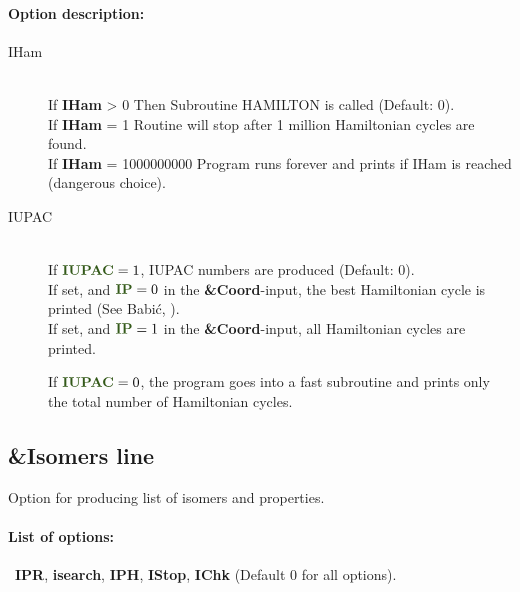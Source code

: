 \documentclass[article,a4paper,twoside]{memoir}
\newcommand{\paramname}[1]{{\color{green}\textbf{#1}}}
\begin{document}
\paragraph{Option description:}
\begin{description}
\item[IHam] \ \\
  If \paramname{IHam} > 0 Then Subroutine HAMILTON is called (Default: 0).\\
  If \paramname{IHam} = 1 Routine will stop after 1 million Hamiltonian cycles are found.\\
  If \paramname{IHam} = 1000000000 Program runs forever and prints if IHam is reached (dangerous choice).\\
\item[IUPAC]\ \\ 
  If $\paramname{IUPAC} = 1$, IUPAC numbers are produced (Default: 0).\\
  If set, and $\paramname{IP} = 0$ in the \paramname{\&Coord}-input, the best Hamiltonian cycle is printed 
  (See Babi\'c,  \cite{Babic1995a}).\\
  If set, and $\paramname{IP} = 1$ in the \paramname{\&Coord}-input, all Hamiltonian cycles are printed.

  If $\paramname{IUPAC} = 0$, the program goes into a fast subroutine and prints only the total number of Hamiltonian cycles.
\end{description}

\clearpage

\subsection{\&Isomers line}
 Option for producing list of isomers and properties.
\paragraph{List of options:}\ \paramname{IPR}, \paramname{isearch}, \paramname{IPH}, \paramname{IStop}, \paramname{IChk} (Default 0 for all options).\\
\end{document}
